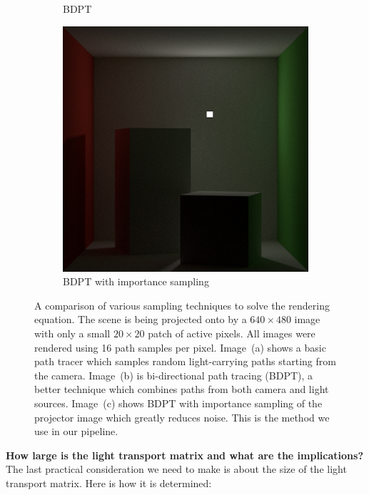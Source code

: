 \begin{figure}[ht]
\begin{subfigure}[b]{0.32\textwidth}
        \caption{BDPT}
        \vspace*{5mm}
        \label{fig:methods_sampling_bdpt}
    \end{subfigure}
    \hfill
    \begin{subfigure}[b]{0.32\textwidth}
        \centering
        \includegraphics[width=\textwidth]{images/03-sampling_bdpt_importance.jpg}
        \caption{BDPT with importance sampling}
        \label{fig:methods_sampling_bdpt_importance}
    \end{subfigure}
    \caption{A comparison of various sampling techniques to solve the rendering equation. The scene is being projected onto by a \(640 \times 480\) image with only a small \(20 \times 20\) patch of active pixels. All images were rendered using 16 path samples per pixel. Image~(a) shows a basic path tracer which samples random light-carrying paths starting from the camera. Image~(b) is bi-directional path tracing (BDPT), a better technique which combines paths from both camera and light sources. Image~(c) shows BDPT with importance sampling of the projector image which greatly reduces noise. This is the method we use in our pipeline.}
    \label{fig:methods_sampling}
\end{figure}

\textbf{How large is the light transport matrix and what are the implications?} The last practical consideration we need to make is about the size of the light transport matrix. Here is how it is determined:

